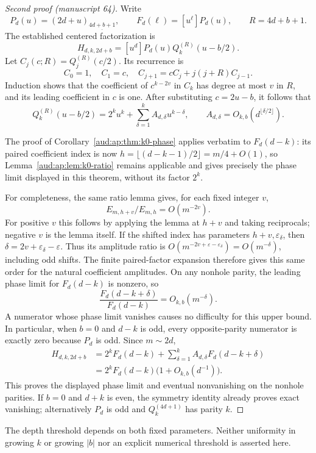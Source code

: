 \documentclass[11pt,a4paper]{article}
\numberwithin{equation}{section}
\begin{document}
\begin{proof}[Second proof (manuscript 64)]
Write
\[
 P_d(u)=(2d+u)_{\underline{4d+b+1}},\qquad
 F_d(\ell)=[u^\ell]P_d(u),\qquad R=4d+b+1.
\]
The established centered factorization is
\[
 H_{d,k,2d+b}=[u^d]P_d(u)Q_k^{(R)}(u-b/2).
\]
Let $C_j(c;R)=Q_j^{(R)}(c/2)$. Its recurrence is
\[
 C_0=1,\quad C_1=c,\quad
 C_{j+1}=cC_j+j(j+R)C_{j-1}.
\]
Induction shows that the coefficient of $c^{k-2v}$ in $C_k$ has degree at most $v$ in $R$, and its leading coefficient in $c$ is one. After substituting $c=2u-b$, it follows that
\[
 Q_k^{(R)}(u-b/2)=2^ku^k+
 \sum_{\delta=1}^k A_{d,\delta}u^{k-\delta},
 \qquad A_{d,\delta}=O_{k,b}(d^{\lfloor\delta/2\rfloor}).
\]

The proof of Corollary~\ref{aud:ap:thm:k0-phase} applies verbatim to $F_d(d-k)$: its paired coefficient index is now $h=\lfloor(d-k-1)/2\rfloor=m/4+O(1)$, so Lemma~\ref{aud:ap:lem:k0-ratio} remains applicable and gives precisely the phase limit displayed in this theorem, without its factor $2^k$.

For completeness, the same ratio lemma gives, for each fixed integer $v$, 
\[
 E_{m,h+v}/E_{m,h}=O(m^{-2v}).
\]
For positive $v$ this follows by applying the lemma at $h+v$ and taking reciprocals; negative $v$ is the lemma itself. If the shifted index has parameters $h+v,\varepsilon_\delta$, then $\delta=2v+\varepsilon_\delta-\varepsilon$. Thus its amplitude ratio is $O(m^{-2v+\varepsilon-\varepsilon_\delta})=O(m^{-\delta})$, including odd shifts. The finite paired-factor expansion therefore gives this same order for the natural coefficient amplitudes. On any nonhole parity, the leading phase limit for $F_d(d-k)$ is nonzero, so
\[
 \frac{F_d(d-k+\delta)}{F_d(d-k)}=O_{k,b}(m^{-\delta}).
\]
A numerator whose phase limit vanishes causes no difficulty for this upper bound. In particular, when $b=0$ and $d-k$ is odd, every opposite-parity numerator is exactly zero because $P_d$ is odd. Since $m\sim2d$,
\[
 \begin{split}
 H_{d,k,2d+b}
 &=2^kF_d(d-k)+\sum_{\delta=1}^kA_{d,\delta}F_d(d-k+\delta)\\
 &=2^kF_d(d-k)\bigl(1+O_{k,b}(d^{-1})\bigr).
 \end{split}
\]
This proves the displayed phase limit and eventual nonvanishing on the nonhole parities. If $b=0$ and $d+k$ is even, the symmetry identity already proves exact vanishing; alternatively $P_d$ is odd and $Q_k^{(4d+1)}$ has parity $k$.
\end{proof}

The depth threshold depends on both fixed parameters. Neither uniformity in growing $k$ or growing $|b|$ nor an explicit numerical threshold is asserted here.
\end{document}
